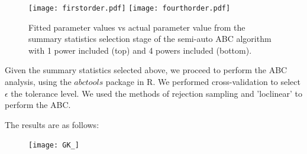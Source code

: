 \documentclass[a4paper,10pt]{article}
\begin{document}
\begin{figure}
\label{fig:powers}
\texttt{[image: firstorder.pdf]}
\texttt{[image: fourthorder.pdf]}
\caption{Fitted parameter values vs actual parameter value from the summary statistics selection stage of the semi-auto ABC algorithm with 1 power included (top) and 4 powers included (bottom).}
\end{figure}



Given the summary statistics selected above, we proceed to perform the ABC analysis, using the $abctools$ package in R.
We performed cross-validation to select $\epsilon$ the tolerance level. We used the methods of rejection sampling and 'loclinear' to perform the ABC.

The results are as follows:
\begin{figure}
\label{}
\texttt{[image: GK\_]}
\end{figure}




\end{document}
